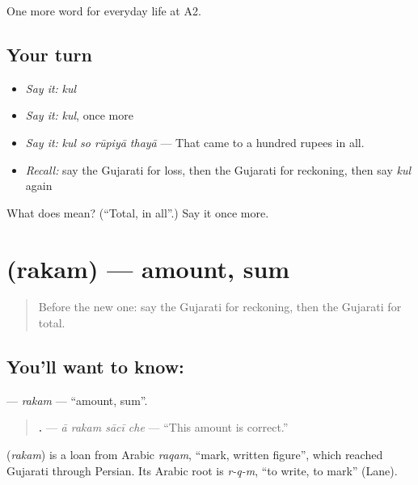 \begin{grammarlens}[title={What you've built}]
One more word for everyday life at A2.
\end{grammarlens}

\subsection*{Your turn}
\begin{itemize}
\raggedright
  \item \emph{Say it:} \emph{kul}
  \item \emph{Say it:} \emph{kul}, once more
  \item \emph{Say it:} \emph{kul so rūpiyā thayā} — That came to a hundred rupees in all.
  \item \emph{Recall:} say the Gujarati for loss, then the Gujarati for reckoning, then say \emph{kul} again
\end{itemize}

\begin{tcolorbox}[breakable,colback=teal!4,colframe=teal!35!black,title={Before you move on}]
What does  mean? (\textquotedblleft{}Total, in all\textquotedblright{}.) Say it once more.
\end{tcolorbox}
\section[\texorpdfstring{\gu{રકમ} (rakam)}{રકમ (rakam)}]{ (rakam) — amount, sum}

\label{lesson:GU-C192-rakam}



\begin{quote}
Before the new one: say the Gujarati for reckoning, then the Gujarati for total.
\end{quote}

\subsection*{You'll want to know: }
\textbf{} — \emph{rakam} — \textquotedblleft{}amount, sum\textquotedblright{}.

\begin{quote}
\textbf{   .} — \emph{ā rakam sācī che} — \textquotedblleft{}This amount is correct.\textquotedblright{}
\end{quote}

\begin{cousinweb}
\textbf{} (\emph{rakam}) is a loan from Arabic \emph{raqam}, \textquotedblleft{}mark, written figure\textquotedblright{}, which reached Gujarati through Persian. Its Arabic root is \emph{r-q-m}, \textquotedblleft{}to write, to mark\textquotedblright{} (Lane).
\end{cousinweb}

